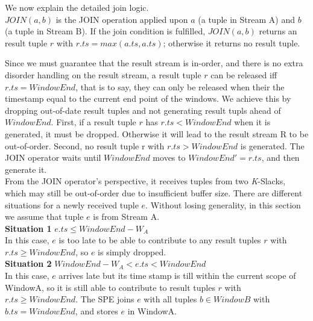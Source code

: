 \documentclass[a4paper, 11pt, twoside]{report}
\begin{document}
We now explain the detailed join logic.\\

$JOIN(a, b)$ is the JOIN operation applied upon $a$ (a tuple in Stream A) and $b$ (a tuple in Stream B). If the join condition is fulfilled, $JOIN(a, b)$ returns an result tuple $r$ with $r.ts = max(a.ts, a.ts)$; otherwise it returns no result tuple.\\

%
%
%

Since we must guarantee that the result stream is in-order, and there is no extra disorder handling on the result stream, a result tuple $r$ can be released iff $r.ts=WindowEnd$, that is to say, they can only be released when their the timestamp equal to the current end point of the windows. We achieve this by dropping out-of-date result tuples and not generating result tupls ahead of $WindowEnd$. First, if a result tuple $r$ has $r.ts<WindowEnd$ when it is generated, it must be dropped. Otherwise it will lead to the result stream R to be out-of-order. Second, no result tuple r with $r.ts>WindowEnd$ is generated. The JOIN operator waits until $WindowEnd$ moves to $WindowEnd'=r.ts$, and then generate it.\\

From the JOIN operator's perspective, it receives tuples from two \textit{K}-Slacks, which may still be out-of-order due to insufficient buffer size. There are different situations for a newly received tuple $e$. Without losing generality, in this section we assume that tuple $e$ is from Stream A.\\

\noindent\textbf{Situation 1} $e.ts\leq WindowEnd - W_A$\\

In this case, $e$ is too late to be able to contribute to any result tuples $r$ with $r.ts\geq WindowEnd$, so $e$ is simply dropped.\\

\noindent\textbf{Situation 2} $WindowEnd - W_A<e.ts<WindowEnd$\\

In this case, $e$ arrives late but its time stamp is till within the current scope of WindowA, so it is still able to contribute to result tuples $r$ with $r.ts\geq WindowEnd$. The SPE joins $e$ with all tuples $b\in WindowB$ with $b.ts=WindowEnd$, and stores $e$ in WindowA.\\
\end{document}
